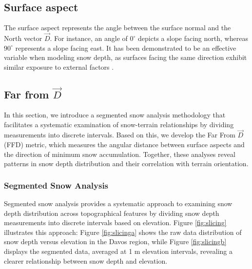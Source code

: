 \documentclass[preprint,12pt]{elsarticle}
\begin{document}
\subsection{Surface aspect}
\label{subsec:aspect}

The surface aspect represents the angle between the surface normal and the North vector $\Vec{D}$. For instance, an angle of $0^\circ$ depicts a slope facing north, whereas $90^\circ$ represents a slope facing east. It has been demonstrated to be an effective variable when modeling snow depth, as surfaces facing the same direction exhibit similar exposure to external factors \cite{zhong2021impacts}. 

\subsection{Far from $\Vec{D}$}
\label{subsec:ffd}

In this section, we introduce a segmented snow analysis methodology that facilitates a systematic examination of snow-terrain relationships by dividing measurements into discrete intervals. Based on this, we develop the Far From $\Vec{D}$ (FFD) metric, which measures the angular distance between surface aspects and the direction of minimum snow accumulation. Together, these analyses reveal patterns in snow depth distribution and their correlation with terrain orientation.

\subsubsection{Segmented Snow Analysis}

Segmented snow analysis provides a systematic approach to examining snow depth distribution across topographical features by dividing snow depth measurements into discrete intervals based on elevation. %
Figure \ref{fig:slicing} illustrates this approach: Figure \ref{fig:slicinga} shows the raw data distribution of snow depth versus elevation in the Davos region, while Figure \ref{fig:slicingb} displays the segmented data, averaged at 1 m elevation intervals, revealing a clearer relationship between snow depth and elevation. %
\end{document}
